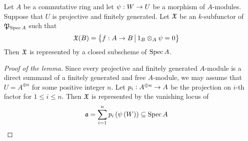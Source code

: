 \begin{lemma}\label{lemma:representability_of_vanishing_locus}
Let $A$ be a commutative ring and let $\psi:W\rightarrow U$ be a morphism of $A$-modules. Suppose that $U$ is projective and finitely generated. Let ${\mathfrak X}$ be an $k$-subfunctor of ${\mathfrak P}_{\mathrm{Spec}\, A}$ such that
$${\mathfrak X}(B) = \big\{f:A\rightarrow B\,\big|\,1_B\otimes_A\psi = 0\big\}$$
Then ${\mathfrak X}$ is represented by a closed subscheme of $\mathrm{Spec}\, A$.
\end{lemma}
\begin{proof}[Proof of the lemma]
Since every projective and finitely generated $A$-module is a direct summand of a finitely generated and free $A$-module, we may assume that $U = A^{\oplus n}$ for some positive integer $n$. Let $p_i:A^{\oplus n}\rightarrow A$ be the projection on $i$-th factor for $1\leq i\leq n$. Then ${\mathfrak X}$ is represented by the vanishing locus of
$$\mathfrak{a} = \sum_{i=1}^n p_i\left(\psi\left(W\right)\right) \subseteq \mathrm{Spec}\, A$$
\end{proof}

